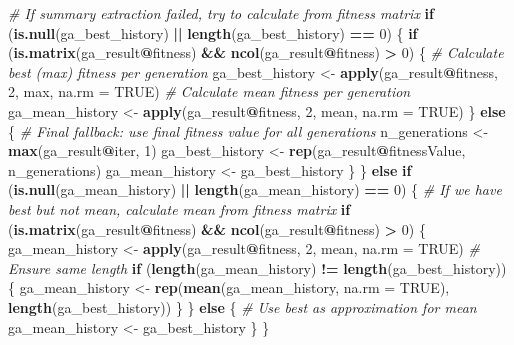 \documentclass[
]{article}
\newenvironment{Shaded}{\begin{snugshade}}{\end{snugshade}}
\newcommand{\AttributeTok}[1]{\textcolor[rgb]{0.13,0.29,0.53}{#1}}
\newcommand{\CommentTok}[1]{\textcolor[rgb]{0.56,0.35,0.01}{\textit{#1}}}
\newcommand{\ConstantTok}[1]{\textcolor[rgb]{0.56,0.35,0.01}{#1}}
\newcommand{\ControlFlowTok}[1]{\textcolor[rgb]{0.13,0.29,0.53}{\textbf{#1}}}
\newcommand{\DecValTok}[1]{\textcolor[rgb]{0.00,0.00,0.81}{#1}}
\newcommand{\FunctionTok}[1]{\textcolor[rgb]{0.13,0.29,0.53}{\textbf{#1}}}
\newcommand{\NormalTok}[1]{#1}
\newcommand{\OtherTok}[1]{\textcolor[rgb]{0.56,0.35,0.01}{#1}}
\newcommand{\SpecialCharTok}[1]{\textcolor[rgb]{0.81,0.36,0.00}{\textbf{#1}}}
\begin{document}
\begin{Shaded}
\begin{Highlighting}[]
\CommentTok{\# If summary extraction failed, try to calculate from fitness matrix}
\ControlFlowTok{if}\NormalTok{ (}\FunctionTok{is.null}\NormalTok{(ga\_best\_history) }\SpecialCharTok{||} \FunctionTok{length}\NormalTok{(ga\_best\_history) }\SpecialCharTok{==} \DecValTok{0}\NormalTok{) \{}
  \ControlFlowTok{if}\NormalTok{ (}\FunctionTok{is.matrix}\NormalTok{(ga\_result}\SpecialCharTok{@}\NormalTok{fitness) }\SpecialCharTok{\&\&} \FunctionTok{ncol}\NormalTok{(ga\_result}\SpecialCharTok{@}\NormalTok{fitness) }\SpecialCharTok{\textgreater{}} \DecValTok{0}\NormalTok{) \{}
    \CommentTok{\# Calculate best (max) fitness per generation}
\NormalTok{    ga\_best\_history }\OtherTok{\textless{}{-}} \FunctionTok{apply}\NormalTok{(ga\_result}\SpecialCharTok{@}\NormalTok{fitness, }\DecValTok{2}\NormalTok{, max, }\AttributeTok{na.rm =} \ConstantTok{TRUE}\NormalTok{)}
    \CommentTok{\# Calculate mean fitness per generation}
\NormalTok{    ga\_mean\_history }\OtherTok{\textless{}{-}} \FunctionTok{apply}\NormalTok{(ga\_result}\SpecialCharTok{@}\NormalTok{fitness, }\DecValTok{2}\NormalTok{, mean, }\AttributeTok{na.rm =} \ConstantTok{TRUE}\NormalTok{)}
\NormalTok{  \} }\ControlFlowTok{else}\NormalTok{ \{}
    \CommentTok{\# Final fallback: use final fitness value for all generations}
\NormalTok{    n\_generations }\OtherTok{\textless{}{-}} \FunctionTok{max}\NormalTok{(ga\_result}\SpecialCharTok{@}\NormalTok{iter, }\DecValTok{1}\NormalTok{)}
\NormalTok{    ga\_best\_history }\OtherTok{\textless{}{-}} \FunctionTok{rep}\NormalTok{(ga\_result}\SpecialCharTok{@}\NormalTok{fitnessValue, n\_generations)}
\NormalTok{    ga\_mean\_history }\OtherTok{\textless{}{-}}\NormalTok{ ga\_best\_history}
\NormalTok{  \}}
\NormalTok{\} }\ControlFlowTok{else} \ControlFlowTok{if}\NormalTok{ (}\FunctionTok{is.null}\NormalTok{(ga\_mean\_history) }\SpecialCharTok{||} \FunctionTok{length}\NormalTok{(ga\_mean\_history) }\SpecialCharTok{==} \DecValTok{0}\NormalTok{) \{}
  \CommentTok{\# If we have best but not mean, calculate mean from fitness matrix}
  \ControlFlowTok{if}\NormalTok{ (}\FunctionTok{is.matrix}\NormalTok{(ga\_result}\SpecialCharTok{@}\NormalTok{fitness) }\SpecialCharTok{\&\&} \FunctionTok{ncol}\NormalTok{(ga\_result}\SpecialCharTok{@}\NormalTok{fitness) }\SpecialCharTok{\textgreater{}} \DecValTok{0}\NormalTok{) \{}
\NormalTok{    ga\_mean\_history }\OtherTok{\textless{}{-}} \FunctionTok{apply}\NormalTok{(ga\_result}\SpecialCharTok{@}\NormalTok{fitness, }\DecValTok{2}\NormalTok{, mean, }\AttributeTok{na.rm =} \ConstantTok{TRUE}\NormalTok{)}
    \CommentTok{\# Ensure same length}
    \ControlFlowTok{if}\NormalTok{ (}\FunctionTok{length}\NormalTok{(ga\_mean\_history) }\SpecialCharTok{!=} \FunctionTok{length}\NormalTok{(ga\_best\_history)) \{}
\NormalTok{      ga\_mean\_history }\OtherTok{\textless{}{-}} \FunctionTok{rep}\NormalTok{(}\FunctionTok{mean}\NormalTok{(ga\_mean\_history, }\AttributeTok{na.rm =} \ConstantTok{TRUE}\NormalTok{), }\FunctionTok{length}\NormalTok{(ga\_best\_history))}
\NormalTok{    \}}
\NormalTok{  \} }\ControlFlowTok{else}\NormalTok{ \{}
    \CommentTok{\# Use best as approximation for mean}
\NormalTok{    ga\_mean\_history }\OtherTok{\textless{}{-}}\NormalTok{ ga\_best\_history}
\NormalTok{  \}}
\NormalTok{\}}


\end{Highlighting}
\end{Shaded}
\end{document}
